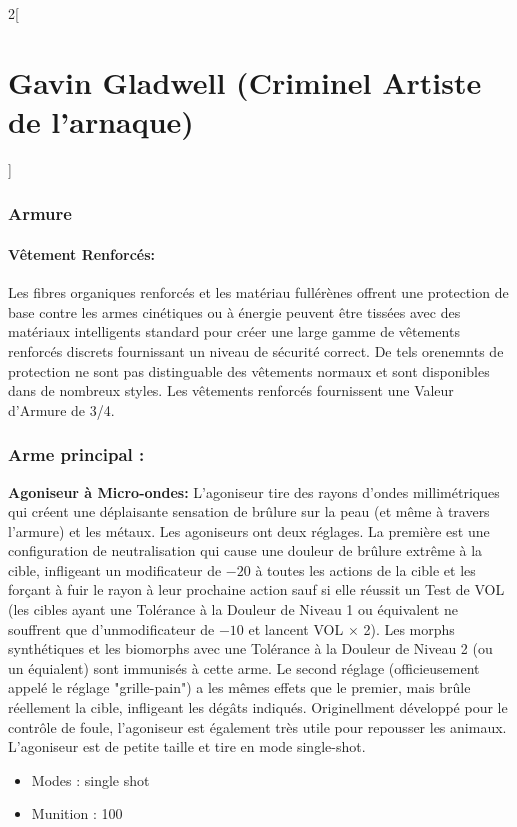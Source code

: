 \documentclass[a4paper,9pt]{article}
\begin{document}
\begin{multicols}{2}[\section*{Gavin Gladwell (Criminel Artiste de l'arnaque)}]
   \subsubsection*{Armure}

\paragraph{Vêtement Renforcés:} Les fibres organiques renforcés et les matériau
fullérènes offrent une protection de base contre les armes cinétiques ou à
énergie peuvent être tissées avec des matériaux intelligents standard pour
créer une large gamme de vêtements renforcés discrets fournissant un niveau de
sécurité correct. De tels orenemnts de protection ne sont pas distinguable des
vêtements normaux et sont disponibles dans de nombreux styles. Les vêtements
renforcés fournissent une Valeur d'Armure de 3/4.

\subsubsection*{Arme principal :}

\textbf{Agoniseur à Micro-ondes:} L'agoniseur tire des rayons d'ondes
millimétriques qui créent une déplaisante sensation de brûlure sur la peau  (et
même à travers l'armure) et les métaux. Les agoniseurs ont deux réglages. La
première est une configuration de neutralisation qui cause une douleur de
brûlure extrême à la cible, infligeant un modificateur de $-20$ à toutes les
actions de la cible et les forçant à fuir le rayon à leur prochaine action sauf
si elle réussit un Test de VOL (les cibles ayant une Tolérance à la Douleur de
Niveau 1 ou équivalent ne souffrent que d'unmodificateur de $-10$ et lancent
VOL $\times$ 2). Les morphs synthétiques et les biomorphs avec une Tolérance à
la Douleur de Niveau 2 (ou un équialent) sont immunisés à cette arme. Le second
réglage (officieusement appelé le réglage "grille-pain") a les mêmes effets que
le premier, mais brûle réellement la cible, infligeant les dégâts indiqués.
Originellment développé pour le contrôle de foule, l'agoniseur est également
très utile pour repousser les animaux. L'agoniseur est de petite taille et tire
en mode single-shot.

\begin{itemize}
   \item Modes : single shot
   \item Munition : 100
\end{itemize}


\end{multicols}
\end{document}
